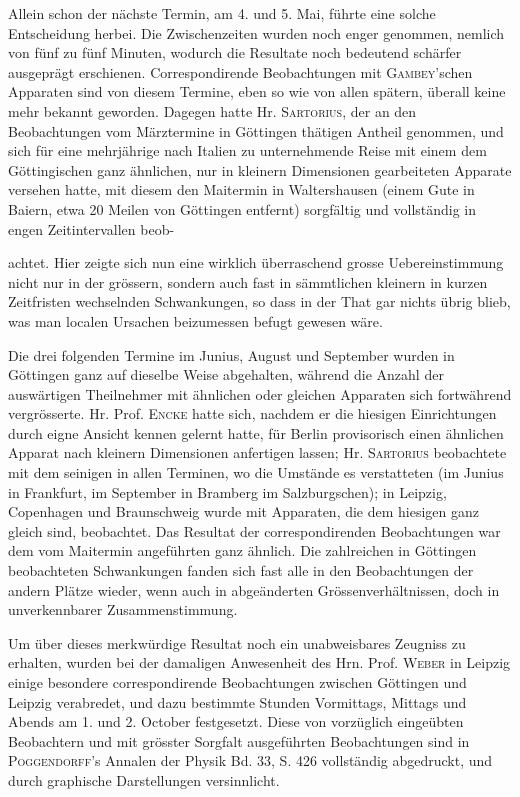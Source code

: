 Allein schon der nächste Termin, am 4. und 5. Mai, führte eine solche Entscheidung herbei. Die Zwischenzeiten wurden noch enger genommen, nemlich von fünf zu fünf Minuten, wodurch die Resultate noch bedeutend schärfer ausgeprägt erschienen. Correspondirende Beobachtungen mit \textsc{Gambey}'schen Apparaten sind von diesem Termine, eben so wie von allen spätern, überall keine mehr bekannt geworden. Dagegen hatte Hr. \textsc{Sartorius}, der an den Beobachtungen vom Märztermine in Göttingen thätigen Antheil genommen, und sich für eine mehrjährige nach Italien zu unternehmende Reise mit einem dem Göttingischen ganz ähnlichen, nur in kleinern Dimensionen gearbeiteten Apparate versehen hatte, mit diesem den Maitermin in Waltershausen (einem Gute in Baiern, etwa 20 Meilen von Göttingen entfernt) sorgfältig und vollständig in engen Zeitintervallen beob-
\par\GaussVSourceGathering{44\textsuperscript{*}}
\par\clearpage
{}
\noindent achtet. Hier zeigte sich nun eine wirklich überraschend grosse Uebereinstimmung nicht nur in der grössern, sondern auch fast in sämmtlichen kleinern in kurzen Zeitfristen wechselnden Schwankungen, so dass in der That gar nichts übrig blieb, was man localen Ursachen beizumessen befugt gewesen wäre.

Die drei folgenden Termine im Junius, August und September wurden in Göttingen ganz auf dieselbe Weise abgehalten, während die Anzahl der auswärtigen Theilnehmer mit ähnlichen oder gleichen Apparaten sich fortwährend vergrösserte. Hr. Prof. \textsc{Encke} hatte sich, nachdem er die hiesigen Einrichtungen durch eigne Ansicht kennen gelernt hatte, für Berlin provisorisch einen ähnlichen Apparat nach kleinern Dimensionen anfertigen lassen; Hr. \textsc{Sartorius} beobachtete mit dem seinigen in allen Terminen, wo die Umstände es verstatteten (im Junius in Frankfurt, im September in Bramberg im Salzburgschen); in Leipzig, Copenhagen und Braunschweig wurde mit Apparaten, die dem hiesigen ganz gleich sind, beobachtet. Das Resultat der correspondirenden Beobachtungen war dem vom Maitermin angeführten ganz ähnlich. Die zahlreichen in Göttingen beobachteten Schwankungen fanden sich fast alle in den Beobachtungen der andern Plätze wieder, wenn auch in abgeänderten Grössenverhältnissen, doch in unverkennbarer Zusammenstimmung.

Um über dieses merkwürdige Resultat noch ein unabweisbares Zeugniss zu erhalten, wurden bei der damaligen Anwesenheit des Hrn. Prof. \textsc{Weber} in Leipzig einige besondere correspondirende Beobachtungen zwischen Göttingen und Leipzig verabredet, und dazu bestimmte Stunden Vormittags, Mittags und Abends am 1. und 2. October festgesetzt. Diese von vorzüglich eingeübten Beobachtern und mit grösster Sorgfalt ausgeführten Beobachtungen sind in \textsc{Poggendorff}'s Annalen der Physik Bd. 33, S. 426 vollständig abgedruckt, und durch graphische Darstellungen versinnlicht.

